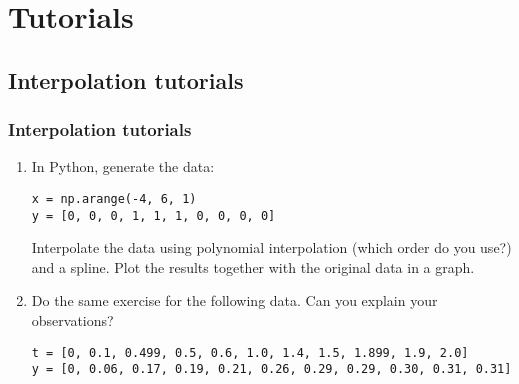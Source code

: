 \section{Tutorials}
\subsection*{Interpolation tutorials}
\begin{frame}[fragile]
  \frametitle{Interpolation tutorials}
  \begin{enumerate}
    \item In Python, generate the data:
    \begin{lstlisting}
x = np.arange(-4, 6, 1)
y = [0, 0, 0, 1, 1, 1, 0, 0, 0, 0]
    \end{lstlisting}
    Interpolate the data using polynomial interpolation (which order do you use?) and a spline. Plot the results together with the original data in a graph.
    \item Do the same exercise for the following data. Can you explain your observations?
    \begin{lstlisting}
t = [0, 0.1, 0.499, 0.5, 0.6, 1.0, 1.4, 1.5, 1.899, 1.9, 2.0]
y = [0, 0.06, 0.17, 0.19, 0.21, 0.26, 0.29, 0.29, 0.30, 0.31, 0.31]
    \end{lstlisting}
  \end{enumerate}
\end{frame}
